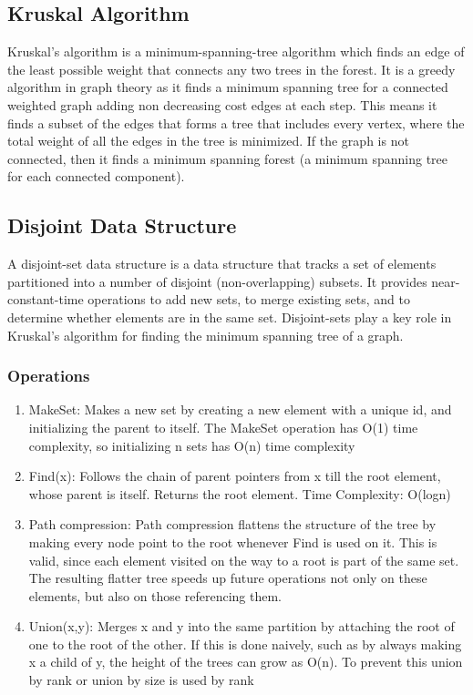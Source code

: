 \documentclass{article}
\begin{document}
\subsection{Kruskal Algorithm}
Kruskal's algorithm is a minimum-spanning-tree algorithm which finds an edge of the least possible weight that connects any two trees in the forest. It is a greedy algorithm in graph theory as it finds a minimum spanning tree for a connected weighted graph adding non decreasing cost edges at each step. This means it finds a subset of the edges that forms a tree that includes every vertex, where the total weight of all the edges in the tree is minimized. If the graph is not connected, then it finds a minimum spanning forest (a minimum spanning tree for each connected component). 

\subsection{Disjoint Data Structure}
A disjoint-set data structure is a data structure that tracks a set of elements partitioned into a number of disjoint (non-overlapping) subsets. It provides near-constant-time operations to add new sets, to merge existing sets, and to determine whether elements are in the same set. Disjoint-sets play a key role in Kruskal's algorithm for finding the minimum spanning tree of a graph.

\subsubsection{Operations}

\begin{enumerate}
    \item MakeSet: Makes a new set by creating a new element with a unique id, and initializing  the parent to itself. The MakeSet operation has O(1) time complexity, so initializing n sets has O(n) time complexity
    \item Find(x): Follows the chain of parent pointers from x till the root element, whose parent is itself. Returns the root element. Time Complexity: O(logn)
    \item Path compression: Path compression flattens the structure of the tree by making every node point to the root whenever Find is used on it. This is valid, since each element visited on the way to a root is part of the same set. The resulting flatter tree speeds up future operations not only on these elements, but also on those referencing them.
    \item Union(x,y): Merges x and y into the same partition by attaching the root of one to the root of the other. If this is done naively, such as by always making x a child of y, the height of the trees can grow as O(n). To prevent this union by rank or union by size is used by rank
\end{enumerate}
\end{document}
